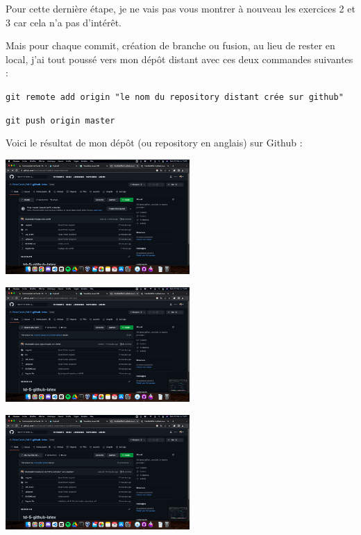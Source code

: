 \documentclass[12pt]{article}
\begin{document}
\vspace{0.3cm}

Pour cette dernière étape, je ne vais pas vous montrer à nouveau les exercices 2 et 3 car cela n'a pas d'intérêt. \newline

Mais pour chaque commit, création de branche ou fusion, au lieu de rester en local, j'ai tout poussé vers mon dépôt distant avec ces deux commandes suivantes :

\texttt{git remote add origin "le nom du repository distant crée sur github"}

\texttt{git push origin master}

\vspace{0.3cm}

Voici le résultat de mon dépôt (ou repository en anglais) sur Github :

\vspace{0.3cm}

\begin{center}
  \includegraphics[width=7cm]{Images-TD-Git/Image-TD-Git-5/Branche-Master.png}
\end{center}

\vspace{0.3cm}

\begin{center}
  \includegraphics[width=7cm]{Images-TD-Git/Image-TD-Git-5/Branche-forward.png}
\end{center}

\vspace{0.3cm}

\begin{center}
  \includegraphics[width=7cm]{Images-TD-Git/Image-TD-Git-5/Barnche-ma-nouvelle.png}
\end{center}
\end{document}
